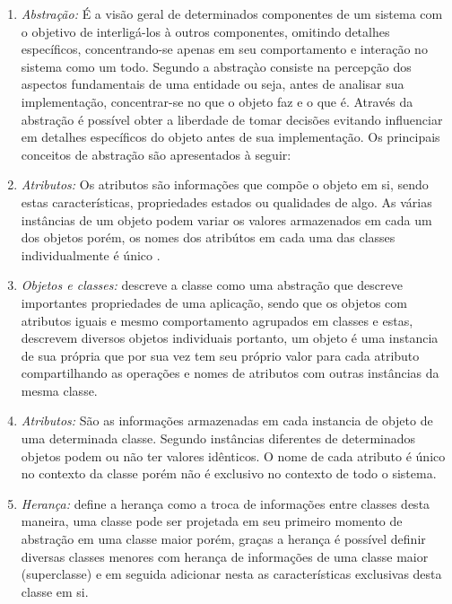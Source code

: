 \begin{enumerate}
\item \textit{Abstração:} É a visão geral de determinados componentes de um sistema com o objetivo de interligá-los à outros componentes, omitindo detalhes específicos, concentrando-se apenas em seu comportamento e interação no sistema como um todo. Segundo \cite{rumbaugh1991object} a abstraçào consiste na percepção dos aspectos fundamentais de uma entidade ou seja, antes de analisar sua implementação, concentrar-se no que o objeto faz e o que é. Através da abstração é possível obter a liberdade de tomar decisões evitando influenciar em detalhes específicos do objeto antes de sua implementação. Os principais conceitos de abstração são apresentados à seguir:

\item \textit{Atributos:} 
Os atributos são informações que compõe o objeto em si, sendo estas características, propriedades estados ou qualidades de algo. As várias instâncias de um objeto podem variar os valores armazenados em cada um dos objetos porém, os nomes dos atribútos em cada uma das classes individualmente é único \cite{rumbaugh1991object}.

\item \textit{Objetos e classes:}  
\cite{rumbaugh1991object} descreve a classe como uma abstração que descreve importantes propriedades de uma aplicação, sendo que os objetos com atributos iguais e mesmo comportamento agrupados em classes e estas, descrevem diversos objetos individuais portanto, um objeto é uma instancia de sua própria que por sua vez tem seu próprio valor para cada atributo compartilhando as operações e nomes de atributos com outras instâncias da mesma classe.

\item \textit{Atributos:} São as informações armazenadas em cada instancia de objeto de uma determinada classe. Segundo \cite{rumbaugh1991object} instâncias diferentes de determinados objetos podem ou não ter valores idênticos. O nome de cada atributo é único no contexto da classe porém não é exclusivo no contexto de todo o sistema.

\item \textit{Herança:} \cite{rumbaugh1991object} define a herança como a troca de informações entre classes desta maneira, uma classe pode ser projetada em seu primeiro momento de abstração em uma classe maior porém, graças a herança é possível definir diversas classes menores com herança de informações de uma classe maior (superclasse) e em seguida adicionar nesta as características exclusivas desta classe em si. 


\end{enumerate}
